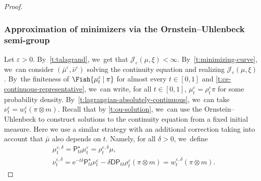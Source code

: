 \documentclass[JEP,XML,SOM,Unicode,published]{cedram}
\theoremstyle{definition}
\theoremstyle{remark}
\newcommand{\given}[1][]{%
\nonscript\:#1\vert
\allowbreak
\nonscript\:
\mathopen{}}
\begin{document}
\begin{proof}
\subsubsection*{Approximation of minimizers via the Ornstein--Uhlenbeck semi-group}
Let $\varepsilon > 0$.
By~\cref{t:talagrand}, we~get that $\mathcal{J}_{\varepsilon}(\mu, \xi) < \infty$.
By~\cref{t:minimizing-curve}, we~can consider $(\bar{\mu}^{\varepsilon}, \bar{\nu}^{\varepsilon})$ solving the continuity equation and realizing $\mathcal{J}_{\varepsilon}(\mu, \xi)$.
By~the finiteness of $\Fish{ \mu_{t}^{\varepsilon} \given \pi }$ for almost every $t \in [0,1]$ and \cref{t:ce-continuous-representative}, we~can write, for all $t \in [0,1]$, $\mu_{t}^{\varepsilon} = \rho_{t}^{\varepsilon} \pi$ for some probability density.
By~\cref{t:lagrangian-absolutely-continuous}, we~can take $\nu_{t}^{\varepsilon} = w_{t}^{\varepsilon} (\pi \otimes m)$.
Recall that by \cref{t:ou-solution}, we~can use the Ornstein--Uhlenbeck to construct solutions to the continuity equation from a fixed initial measure.
Here we use a similar strategy with an additional correction taking into account that $\bar{\mu}$ also depends on $t$.
Namely, for all $\delta > 0$, we~define
\begin{align*}
& \mu_{t}^{\varepsilon,\delta} = \mathsf{P}^{\star}_{t\delta} \mu_{t}^{\varepsilon} = \rho^{\varepsilon, \delta}_{t} \mu, \\
& \nu_{t}^{\varepsilon,\delta} = \mathrm{e}^{-t\delta} \mathsf{P}_{t\delta}^{\star} \nu_{t}^{\varepsilon} - \delta \mathsf{D} \mathsf{P}_{t\delta} \rho_{t}^{\varepsilon} (\pi \otimes m) = w^{\varepsilon,\delta}_{t} (\pi \otimes m).
\end{align*}


\end{proof}
\end{document}
